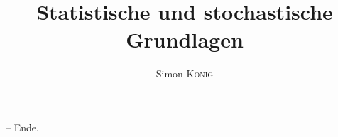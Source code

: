 \documentclass[blue, ngerman]{../LaTeX-Templates/Skript/skript}
\author{Simon \textsc{König}}
\title{Statistische und stochastische Grundlagen \\\subtitleformat{Vorlesungsmitschrieb zum Modul an der Universität Stuttgart}}
\begin{document}
\maketitle

\tableofcontents


\bigskip

-- Ende.



\nocite{*}
\end{document}
